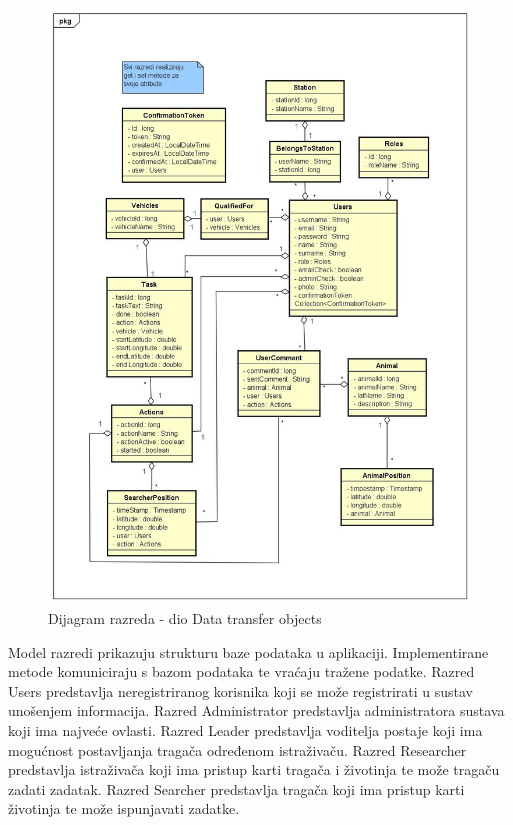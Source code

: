 			\eject

			\begin{figure}[H]
				\includegraphics[scale=0.5]{slike/klasni_dijagram_DTO.jpg}
				\centering
				\caption{Dijagram razreda - dio Data transfer objects}
				\label{fig:data_transfer_objects}
			\end{figure}

			Model razredi prikazuju strukturu baze podataka u aplikaciji. 
			Implementirane metode komuniciraju s bazom podataka te vraćaju tražene podatke. 
			Razred Users predstavlja neregistriranog korisnika koji se može registrirati u 
			sustav unošenjem informacija. Razred Administrator predstavlja administratora 
			sustava koji ima najveće ovlasti. Razred Leader predstavlja voditelja postaje koji ima mogućnost postavljanja tragača određenom istraživaču.
			Razred Researcher predstavlja istraživača koji ima pristup karti tragača i životinja te može tragaču zadati zadatak. 
			Razred Searcher predstavlja tragača koji ima pristup karti životinja te može ispunjavati zadatke.


